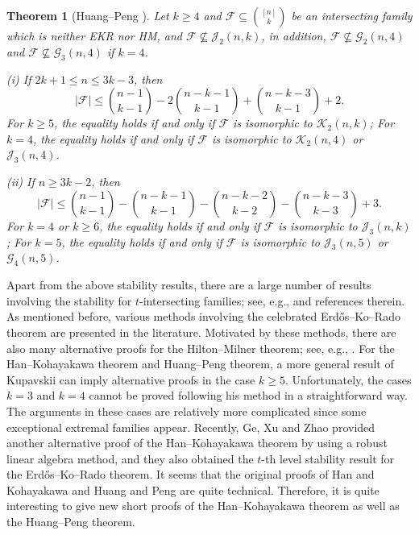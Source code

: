 \documentclass[11pt]{article}
\numberwithin{equation}{section}
\newtheorem{theorem}{Theorem}[section]
\begin{document}
\begin{theorem}[Huang--Peng \cite{H24}] \label{H24}
 Let $k \geq 4$ and $\mathcal{F} \subseteq\binom{[n]}{k}$ be an intersecting family which is neither EKR nor HM, and $\mathcal{F} \nsubseteq \mathcal{J}_2(n, k)$, in addition, $\mathcal{F} \nsubseteq \mathcal{G}_2(n, 4)$ and $\mathcal{F} \nsubseteq \mathcal{G}_3(n, 4)$ if $k=4$.

\noindent(i) If $2 k+1 \leq n \leq 3 k-3$, then
$$
|\mathcal{F}| \leq\binom{n-1}{k-1}-2\binom{n-k-1}{k-1}+\binom{n-k-3}{k-1}+2.
$$
For $k\ge 5$, 
the equality holds if and only if  $\mathcal{F}$ is isomorphic to $ \mathcal{K}_2(n, k)$;
For $k=4$, the equality holds if and only if   $\mathcal{F} $ is isomorphic to $ \mathcal{K}_2(n, 4)$ or $\mathcal{J}_3(n, 4)$.

\noindent(ii) If $n \geq 3 k-2$, then
$$
|\mathcal{F}| \leq\binom{n-1}{k-1}-\binom{n-k-1}{k-1}-\binom{n-k-2}{k-2}-\binom{n-k-3}{k-3}+3.
$$
For $k=4$ or $k\ge 6$, the equality holds if and only if $\mathcal{F} $ is isomorphic to $ \mathcal{J}_3(n, k)$; 
For $k=5$, the equality holds 
if and only if  $\mathcal{F} $ is isomorphic to $\mathcal{J}_3(n, 5)$ or $\mathcal{G}_4(n, 5)$.
\end{theorem}

Apart from the above stability results, there are a large number of results involving the stability for $t$-intersecting families; see, e.g., \cite{BL2022,CLW2021,CLLW2022,GLX2022,L24,OV2021} and references therein. 
As mentioned before, various methods involving the 
celebrated Erd\H{o}s--Ko--Rado theorem are presented in the literature.  Motivated by these methods, 
there are also many alternative proofs for the Hilton--Milner theorem; see, e.g., \cite{BW2024,F19,FF1986,FT92, H18,KZ2018}. 
For the Han--Kohayakawa theorem and Huang--Peng theorem, a more general result of Kupavskii \cite{K19,Kup2024} can imply alternative proofs in the case $k\geq 5$. Unfortunately, the cases $k=3$ and $k=4$ cannot be proved following his method in a straightforward way. 
The arguments in these cases are relatively more complicated since some exceptional extremal families  appear. 
Recently, Ge, Xu and Zhao \cite{GXZ2024} 
provided another alternative proof of the Han--Kohayakawa theorem by using a robust linear algebra method, and they also obtained the $t$-th level stability result for the Erd\H{o}s--Ko--Rado theorem. 
It seems that the original proofs of Han and Kohayakawa \cite{H17} and Huang and Peng \cite{H24} are quite technical.  Therefore, it is  quite interesting to give new short proofs of the Han--Kohayakawa theorem as well as the Huang--Peng theorem. 
\end{document}
